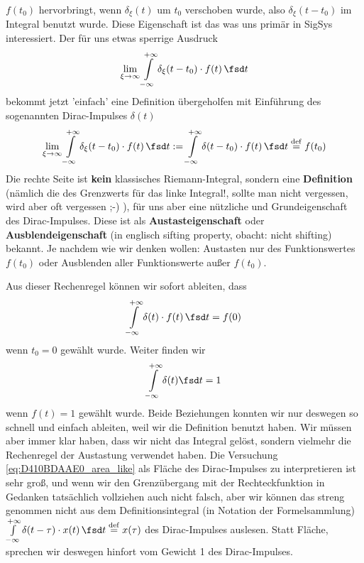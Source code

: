 \begin{Werkzeug}
$f(t_0)$ hervorbringt, wenn $\delta_\xi(t)$ um $t_0$ verschoben wurde, also
$\delta_\xi(t-t_0)$ im Integral benutzt wurde.
%
Diese Eigenschaft ist das was uns primär in SigSys interessiert.
%
Der für uns etwas sperrige Ausdruck
\begin{equation}
\lim_{\xi\to\infty} \int\limits_{-\infty}^{+\infty}
\delta_\xi(t-t_0) \cdot f(t) \, \fsd t
\end{equation}
bekommt jetzt 'einfach' eine Definition übergeholfen mit
Einführung des sogenannten Dirac-Impulses $\delta(t)$
\begin{equation}
\label{eq:DiracDistrDef}
\lim_{\xi\to\infty} \int\limits_{-\infty}^{+\infty}
\delta_\xi(t-t_0) \cdot f(t) \, \fsd t
:= \int\limits_{-\infty}^{+\infty} \delta(t-t_0) \cdot f(t) \, \fsd t \stackrel{\mathrm{def}}= f(t_0)
\end{equation}
%
Die rechte Seite ist \textbf{kein} klassisches Riemann-Integral, sondern eine
\textbf{Definition} (nämlich die des Grenzwerts für das linke Integral!,
sollte man nicht vergessen, wird aber oft vergessen ;-) ),
für uns aber eine nützliche  und Grundeigenschaft des
Dirac-Impulses. Diese ist als \textbf{Austasteigenschaft} oder
\textbf{Ausblendeigenschaft} (in englisch sifting property, obacht: nicht shifting)
bekannt. Je nachdem wie wir denken wollen:
Austasten nur des Funktionswertes $f(t_0)$ oder Ausblenden aller Funktionswerte
außer $f(t_0)$.

Aus dieser Rechenregel können wir sofort ableiten, dass
\begin{equation}
\label{}
\int\limits_{-\infty}^{+\infty} \delta(t) \cdot f(t) \, \fsd t = f(0)
\end{equation}
wenn $t_0=0$ gewählt wurde.
%
Weiter finden wir
\begin{equation}
\label{eq:D410BDAAE0_area_like}
\int\limits_{-\infty}^{+\infty} \delta(t) \fsd t = 1
\end{equation}
wenn $f(t)=1$ gewählt wurde.
%
Beide Beziehungen konnten wir nur deswegen so schnell und einfach ableiten, weil
wir die Definition benutzt haben. Wir müssen aber immer klar haben, dass wir
nicht das Integral gelöst, sondern vielmehr die Rechenregel der Austastung
verwendet haben.
%
Die Versuchung \eqref{eq:D410BDAAE0_area_like} als Fläche
des Dirac-Impulses zu interpretieren
ist sehr groß, und wenn wir den Grenzübergang mit der Rechteckfunktion in Gedanken
tatsächlich vollziehen auch nicht falsch, aber wir können das streng genommen
nicht aus dem Definitionsintegral (in Notation der Formelsammlung)
$\int\limits_{-\infty}^{+\infty} \delta(t-\tau) \cdot x(t) \, \fsd t \stackrel{\mathrm{def}}= x(\tau)$
des Dirac-Impulses auslesen.
%
Statt Fläche, sprechen wir deswegen hinfort vom Gewicht 1 des Dirac-Impulses.

\end{Werkzeug}

